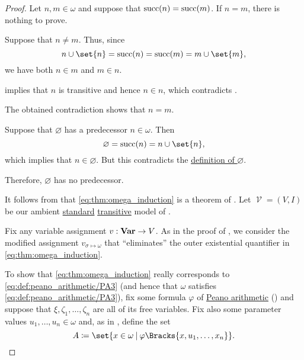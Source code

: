 \begin{proof}
   Let \( n, m \in \omega \) and suppose that \( \operatorname{succ}(n) = \operatorname{succ}(m) \). If \( n = m \), there is nothing to prove.

  Suppose that \( n \neq m \). Thus, since
  \begin{equation*}
    n \cup \set{ n } = \op{succ}(n) = \op{succ}(m) = m \cup \set{ m },
  \end{equation*}
  we have both \( n \in m \) and \( m \in n \).

   implies that \( n \) is transitive and hence \( n \in n \), which contradicts .

  The obtained contradiction shows that \( n = m \).

   Suppose that \( \varnothing \) has a predecessor \( n \in \omega \). Then
  \begin{equation*}
    \varnothing = \op{succ}(n) = n \cup \set{ n },
  \end{equation*}
  which implies that \( n \in \varnothing \). But this contradicts the \hyperref[def:empty_set]{definition of \( \varnothing \)}.

  Therefore, \( \varnothing \) has no predecessor.

   It follows from  that \eqref{eq:thm:omega_induction} is a theorem of . Let \( \mscrV = (V, I) \) be our ambient \hyperref[rem:standard_model_of_set_theory]{standard} \hyperref[rem:transitive_model_of_set_theory]{transitive} model of .

  Fix any variable assignment \( v: \operatorname{\mathbf{Var}} \to V \). As in the proof of , we consider the modified assignment \( v_{\sigma \mapsto \omega} \) that \enquote{eliminates} the outer existential quantifier in \eqref{eq:thm:omega_induction}.

  To show that \eqref{eq:thm:omega_induction} really corresponds to \eqref{eq:def:peano_arithmetic/PA3} (and hence that \( \omega \) satisfies \eqref{eq:def:peano_arithmetic/PA3}), fix some formula \( \varphi \) of \hyperref[def:peano_arithmetic]{Peano arithmetic} () and suppose that \( \xi, \zeta_1, \ldots, \zeta_n \) are all of its free variables. Fix also some parameter values \( u_1, \ldots, u_n \in \omega \) and, as in , define the set
  \begin{equation*}
    A \coloneqq \set{ x \in \omega \given \varphi\Bracks{x, u_1, \ldots, x_n} }.
  \end{equation*}


\end{proof}
